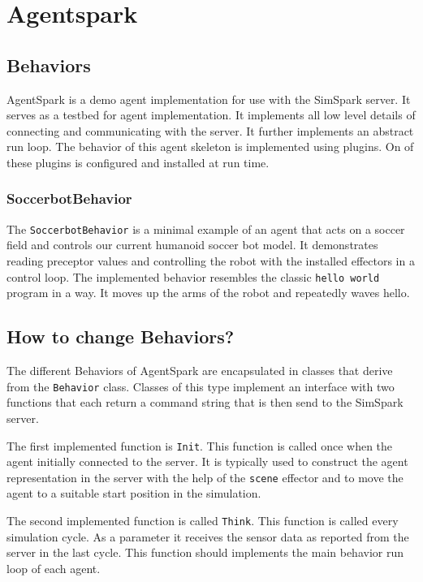 \chapter{Agentspark}

\section{Behaviors}

AgentSpark is a demo agent implementation for use with the SimSpark
server. It serves as a testbed for agent implementation. It implements
all low level details of connecting and communicating with the
server. It further implements an abstract run loop. The behavior of
this agent skeleton is implemented using plugins. On of these plugins
is configured and installed at run time.

\subsection{SoccerbotBehavior}

The \texttt{SoccerbotBehavior} is a minimal example of an agent that
acts on a soccer field and controls our current humanoid soccer bot
model. It demonstrates reading preceptor values and controlling the
robot with the installed effectors in a control loop. The implemented
behavior resembles the classic \texttt{hello world} program in a
way. It moves up the arms of the robot and repeatedly waves hello.

\section{How to change Behaviors?}

The different Behaviors of AgentSpark are encapsulated in classes
that derive from the \texttt{Behavior} class. Classes of this type
implement an interface with two functions that each return a command
string that is then send to the SimSpark server.

The first implemented function is \texttt{Init}. This function is
called once when the agent initially connected to the server. It is
typically used to construct the agent representation in the server
with the help of the \texttt{scene} effector and to move the agent to
a suitable start position in the simulation.

The second implemented function is called \texttt{Think}. This
function is called every simulation cycle. As a parameter it receives
the sensor data as reported from the server in the last cycle. This
function should implements the main behavior run loop of each
agent.

